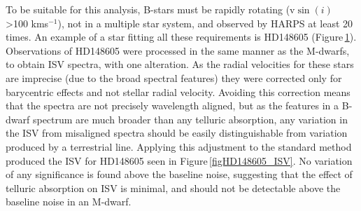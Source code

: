 To be suitable for this analysis, B-stars must be rapidly rotating (v$\sin(i)$ \textgreater100 kms$^{-1}$), not in a multiple star system, and observed by HARPS at least 20 times. An example of a star fitting all these requirements is HD148605 (Figure\,\ref{figHD146805}). Observations of HD148605 were processed in the same manner as the M-dwarfs, to obtain ISV spectra, with one alteration. As the radial velocities for these stars are imprecise (due to the broad spectral features) they were corrected only for barycentric effects and not stellar radial velocity. Avoiding this correction means that the spectra are not precisely wavelength aligned, but as the features in a B-dwarf spectrum are much broader than any telluric absorption, any variation in the ISV from misaligned spectra should be easily distinguishable from variation produced by a terrestrial line. Applying this adjustment to the standard method produced the ISV for HD148605 seen in Figure\,\ref{figHD148605_ISV}. No variation of any significance is found above the baseline noise, suggesting that the effect of telluric absorption on ISV is minimal, and should not be detectable above the baseline noise in an M-dwarf.\\

\begin{figure}
    \centering
	\captionsetup{width=.8\textwidth}
    \\
    \caption{}
    \label{figHD146805}
\end{figure}

